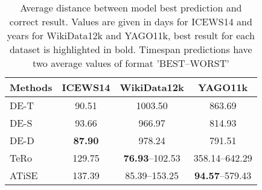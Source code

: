 \begin{table}[htb]
\centering
\begin{minipage}{0.95\columnwidth}
\centering
\caption{Average distance between model best prediction and correct result. Values are given in days for ICEWS14 and years for WikiData12k and YAGO11k, best result for each dataset is highlighted in bold. Timespan predictions have two average values of format '\textsc{BEST}–\textsc{WORST}'}
\vspace{-3mm}

\begin{tabular}{lccc}
\hline
Methods & ICEWS14 & WikiData12k & YAGO11k\\
\hline
DE-T & 90.51 & 1003.50 & 863.69\\
DE-S & 93.66 & 966.97 & 814.93\\
DE-D & \textbf{87.90} & 978.24 & 791.51\\
TeRo & 129.75 & \textbf{76.93}–102.53 & 358.14–642.29\\
ATiSE & 137.39 & 85.39–153.25 & \textbf{94.57}–579.43\\
\hline

\end{tabular}

\label{tab:temporal_precision_avg_diff}
\end{minipage}
\end{table}